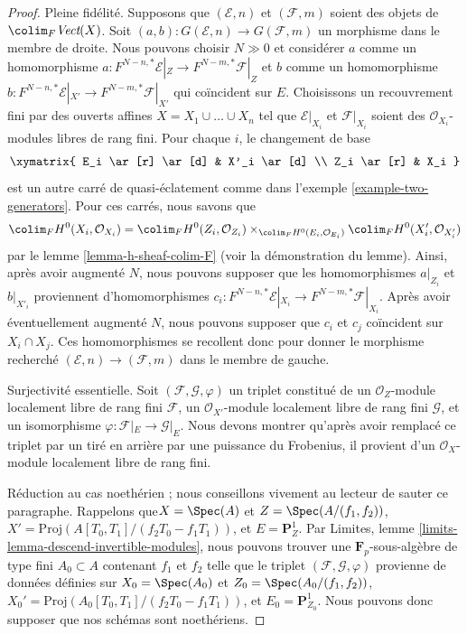 \begin{proof}
Pleine fidélité. Supposons que $(\mathcal{E}, n)$ et
$(\mathcal{F}, m)$ soient des objets de $\colim_F \textit{Vect}(X)$.
Soit $(a, b) : G(\mathcal{E}, n) \to G(\mathcal{F}, m)$
un morphisme dans le membre de droite. Nous pouvons choisir $N \gg 0$ et
considérer $a$ comme un homomorphisme
$a : F^{N - n, *}\mathcal{E}|_Z \to F^{N - m, *}\mathcal{F}|_Z$
et $b$ comme un homomorphisme
$b : F^{N - n, *}\mathcal{E}|_{X'} \to F^{N - m, *}\mathcal{F}|_{X'}$
qui coïncident sur $E$.
Choisissons un recouvrement fini par des ouverts affines
$X = X_1 \cup \ldots \cup X_n$ tel que $\mathcal{E}|_{X_i}$
et $\mathcal{F}|_{X_i}$ soient des $\mathcal{O}_{X_i}$-modules libres de rang fini.
Pour chaque $i$, le changement de base
$$
\xymatrix{
E_i \ar[r] \ar[d] & X'_i \ar[d] \\
Z_i \ar[r] & X_i
}
$$
est un autre carré de quasi-éclatement comme dans l'exemple \ref{example-two-generators}.
Pour ces carrés, nous savons que
$$
\colim_F H^0(X_i, \mathcal{O}_{X_i}) =
\colim_F H^0(Z_i, \mathcal{O}_{Z_i})
\times_{\colim_F H^0(E_i, \mathcal{O}_{E_i})}
\colim_F H^0(X'_i, \mathcal{O}_{X'_i})
$$
par le lemme \ref{lemma-h-sheaf-colim-F} (voir la démonstration du lemme).
Ainsi, après avoir augmenté $N$, nous pouvons supposer que
les homomorphismes $a|_{Z_i}$ et $b|_{X'_i}$ proviennent
d'homomorphismes $c_i : F^{N - n, *}\mathcal{E}|_{X_i} \to F^{N - m, *}\mathcal{F}|_{X_i}$.
Après avoir éventuellement augmenté $N$, nous pouvons supposer que $c_i$ et $c_j$
coïncident sur $X_i \cap X_j$. Ces homomorphismes se recollent donc pour donner le
morphisme recherché $(\mathcal{E}, n) \to (\mathcal{F}, m)$
dans le membre de gauche.

\medskip\noindent
Surjectivité essentielle. Soit $(\mathcal{F}, \mathcal{G}, \varphi)$ un
triplet constitué de
un $\mathcal{O}_Z$-module localement libre de rang fini $\mathcal{F}$,
un $\mathcal{O}_{X'}$-module localement libre de rang fini $\mathcal{G}$, et
un isomorphisme $\varphi : \mathcal{F}|_E \to \mathcal{G}|_E$.
Nous devons montrer qu'après avoir remplacé ce triplet par un tiré en arrière par une
puissance du Frobenius, il provient d'un $\mathcal{O}_X$-module localement libre de rang fini.

\medskip\noindent
Réduction au cas noethérien ; nous conseillons vivement au lecteur de sauter ce paragraphe.
Rappelons que\newline $X = \Spec(A)$ et $Z = \Spec(A/(f_1, f_2))$,
$X' = \text{Proj}(A[T_0, T_1]/(f_2T_0 - f_1T_1))$, et
$E = \mathbf{P}^1_Z$. Par Limites, lemme
\ref{limits-lemma-descend-invertible-modules},
nous pouvons trouver une $\mathbf{F}_p$-sous-algèbre de type fini
$A_0 \subset A$ contenant $f_1$ et $f_2$ telle que le triplet
$(\mathcal{F}, \mathcal{G}, \varphi)$ provienne de données définies sur
$X_0 = \Spec(A_0)$ et $Z_0 = \Spec(A_0/(f_1, f_2))$,
$X_0' = \text{Proj}(A_0[T_0, T_1]/(f_2T_0 - f_1T_1))$, et
$E_0 = \mathbf{P}^1_{Z_0}$. Nous pouvons donc supposer que nos schémas
sont noethériens.


\end{proof}
